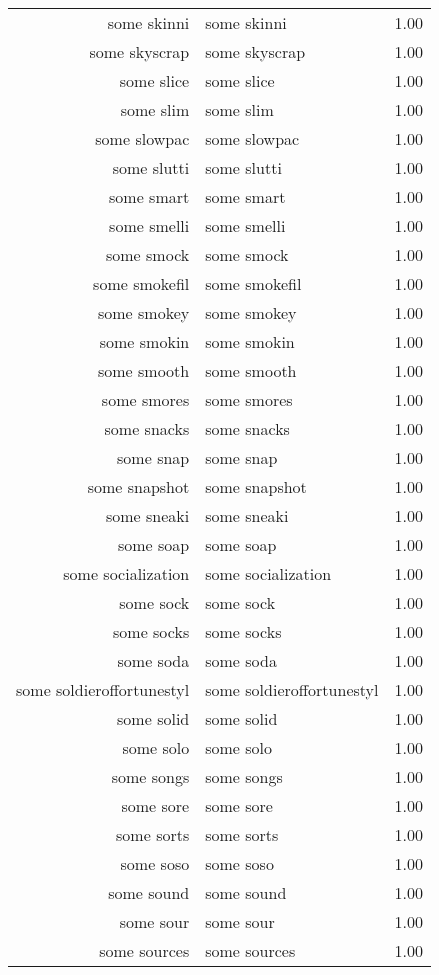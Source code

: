 \begin{table}[ht]
\begin{tabular}{rlr}
  some skinni & some skinni & 1.00 \\ 
  some skyscrap & some skyscrap & 1.00 \\ 
  some slice & some slice & 1.00 \\ 
  some slim & some slim & 1.00 \\ 
  some slowpac & some slowpac & 1.00 \\ 
  some slutti & some slutti & 1.00 \\ 
  some smart & some smart & 1.00 \\ 
  some smelli & some smelli & 1.00 \\ 
  some smock & some smock & 1.00 \\ 
  some smokefil & some smokefil & 1.00 \\ 
  some smokey & some smokey & 1.00 \\ 
  some smokin & some smokin & 1.00 \\ 
  some smooth & some smooth & 1.00 \\ 
  some smores & some smores & 1.00 \\ 
  some snacks & some snacks & 1.00 \\ 
  some snap & some snap & 1.00 \\ 
  some snapshot & some snapshot & 1.00 \\ 
  some sneaki & some sneaki & 1.00 \\ 
  some soap & some soap & 1.00 \\ 
  some socialization & some socialization & 1.00 \\ 
  some sock & some sock & 1.00 \\ 
  some socks & some socks & 1.00 \\ 
  some soda & some soda & 1.00 \\ 
  some soldieroffortunestyl & some soldieroffortunestyl & 1.00 \\ 
  some solid & some solid & 1.00 \\ 
  some solo & some solo & 1.00 \\ 
  some songs & some songs & 1.00 \\ 
  some sore & some sore & 1.00 \\ 
  some sorts & some sorts & 1.00 \\ 
  some soso & some soso & 1.00 \\ 
  some sound & some sound & 1.00 \\ 
  some sour & some sour & 1.00 \\ 
  some sources & some sources & 1.00 \\ 

\end{tabular}
\end{table}
